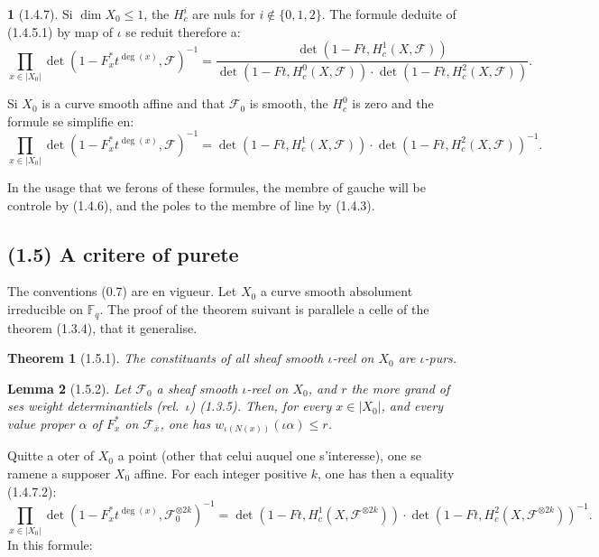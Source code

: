 \documentclass[12pt,a4paper]{article}
\theoremstyle{plain}
\newtheorem{theorem}{Theorem}[section]
\newtheorem{lemma}[theorem]{Lemma}
\theoremstyle{definition}
\theoremstyle{definition}
\newtheorem{para}{}[section]
\theoremstyle{remark}
\begin{document}
\begin{para}[1.4.7]
Si $\dim X_0 \leq 1$, the $H_c^i$ are nuls for $i \notin \{0, 1, 2\}$. The formule deduite of (1.4.5.1) by map of $\iota$ se reduit therefore a:
\begin{equation}\tag{1.4.7.1}
\prod_{x \in |X_0|} \det(1 - F_x^* t^{\deg(x)}, \mathscr{F})^{-1} = \frac{\det(1 - Ft, H_c^1(X, \mathscr{F}))}{\det(1 - Ft, H_c^0(X, \mathscr{F})) \cdot \det(1 - Ft, H_c^2(X, \mathscr{F}))}.
\end{equation}

Si $X_0$ is a curve smooth affine and that $\mathscr{F}_0$ is smooth, the $H_c^0$ is zero and the formule se simplifie en:
\begin{equation}\tag{1.4.7.2}
\prod_{x \in |X_0|} \det(1 - F_x^* t^{\deg(x)}, \mathscr{F})^{-1} = \det(1 - Ft, H_c^1(X, \mathscr{F})) \cdot \det(1 - Ft, H_c^2(X, \mathscr{F}))^{-1}.
\end{equation}

In the usage that we ferons of these formules, the membre of gauche will be controle by (1.4.6), and the poles to the membre of line by (1.4.3).
\end{para}

\newpage

\subsection*{(1.5) A critere of purete}

The conventions (0.7) are en vigueur. Let $X_0$ a curve smooth absolument irreducible on $\mathbb{F}_q$. The proof of the theorem suivant is parallele a celle of the theorem (1.3.4), that it generalise.

\begin{theorem}[1.5.1]
The constituants of all sheaf smooth $\iota$-reel on $X_0$ are $\iota$-purs.
\end{theorem}

\begin{lemma}[1.5.2]
Let $\mathscr{F}_0$ a sheaf smooth $\iota$-reel on $X_0$, and $r$ the more grand of ses weight determinantiels (rel.~$\iota$) (1.3.5). Then, for every $x \in |X_0|$, and every value proper $\alpha$ of $F_x^*$ on $\mathscr{F}_{\overline{x}}$, one has $w_{\iota(N(x))}(\iota\alpha) \leq r$.
\end{lemma}

Quitte a oter of $X_0$ a point (other that celui auquel one s'interesse), one se ramene a supposer $X_0$ affine. For each integer positive $k$, one has then a equality (1.4.7.2):
\begin{equation}\tag{1.5.2.1}
\prod_{x \in |X_0|} \det(1 - F_x^* t^{\deg(x)}, \mathscr{F}_0^{\otimes 2k})^{-1} = \det(1 - Ft, H_c^1(X, \mathscr{F}^{\otimes 2k})) \cdot \det(1 - Ft, H_c^2(X, \mathscr{F}^{\otimes 2k}))^{-1}.
\end{equation}
In this formule:
\end{document}
